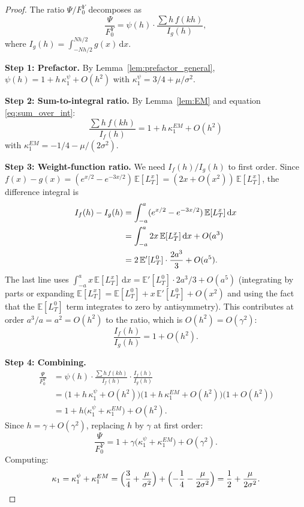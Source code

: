 \documentclass[11pt]{article}
\theoremstyle{definition}
\theoremstyle{remark}
\newcommand{\E}{\mathbb{E}}
\newcommand{\dd}{\,\mathrm{d}}
\begin{document}
\begin{proof}
The ratio $\Psi/F_0^Y$ decomposes as
\begin{equation}\label{eq:decompose}
\frac{\Psi}{F_0^Y}
= \psi(h) \cdot \frac{\sum h\,f(kh)}{I_g(h)},
\end{equation}
where $I_g(h) = \int_{-Nh/2}^{Nh/2} g(x)\dd x$.

\textbf{Step 1: Prefactor.} By
Lemma~\ref{lem:prefactor_general},
$\psi(h) = 1 + h\,\kappa_1^{\psi} + O(h^2)$ with
$\kappa_1^{\psi} = 3/4 + \mu/\sigma^2$.

\textbf{Step 2: Sum-to-integral ratio.} By
Lemma~\ref{lem:EM} and equation \eqref{eq:sum_over_int}:
\[
\frac{\sum h\,f(kh)}{I_f(h)}
= 1 + h\,\kappa_1^{EM} + O(h^2)
\]
with $\kappa_1^{EM} = -1/4 - \mu/(2\sigma^2)$.

\textbf{Step 3: Weight-function ratio.}
We need $I_f(h)/I_g(h)$ to first order. Since $f(x) - g(x) =
(e^{x/2} - e^{-3x/2})\,\E[L^x_T] = (2x + O(x^2))\,\E[L^x_T]$,
the difference integral is
\begin{align}
I_f(h) - I_g(h) &= \int_{-a}^{a}
(e^{x/2} - e^{-3x/2})\,\E[L^x_T]\dd x \notag \\
&= \int_{-a}^a 2x\,\E[L^x_T]\dd x + O(a^3) \notag \\
&= 2\,\E'[L^0_T] \cdot \frac{2a^3}{3} + O(a^5).
\label{eq:If_minus_Ig}
\end{align}
The last line uses $\int_{-a}^a x\,\E[L^x_T]\dd x
= \E'[L^0_T]\cdot 2a^3/3 + O(a^5)$ (integrating by parts or
expanding $\E[L^x_T] = \E[L^0_T] + x\,\E'[L^0_T] + O(x^2)$ and
using the fact that the $\E[L^0_T]$ term integrates to zero by
antisymmetry). This contributes at order $a^3/a = a^2 = O(h^2)$ to
the ratio, which is $O(h^2) = O(\gamma^2)$:
\begin{equation}\label{eq:weight_ratio_first}
\frac{I_f(h)}{I_g(h)} = 1 + O(h^2).
\end{equation}

\textbf{Step 4: Combining.}
\begin{align*}
\frac{\Psi}{F_0^Y}
&= \psi(h) \cdot
\frac{\sum h\,f(kh)}{I_f(h)} \cdot \frac{I_f(h)}{I_g(h)} \\
&= \bigl(1 + h\,\kappa_1^{\psi} + O(h^2)\bigr)
\bigl(1 + h\,\kappa_1^{EM} + O(h^2)\bigr)
\bigl(1 + O(h^2)\bigr) \\
&= 1 + h\bigl(\kappa_1^{\psi} + \kappa_1^{EM}\bigr) + O(h^2).
\end{align*}
Since $h = \gamma + O(\gamma^2)$, replacing $h$ by $\gamma$ at
first order:
\[
\frac{\Psi}{F_0^Y}
= 1 + \gamma\bigl(\kappa_1^{\psi} + \kappa_1^{EM}\bigr) + O(\gamma^2).
\]
Computing:
\[
\kappa_1 = \kappa_1^{\psi} + \kappa_1^{EM}
= \Bigl(\frac{3}{4} + \frac{\mu}{\sigma^2}\Bigr)
+ \Bigl(-\frac{1}{4} - \frac{\mu}{2\sigma^2}\Bigr)
= \frac{1}{2} + \frac{\mu}{2\sigma^2}.
\qedhere
\]
\end{proof}
\end{document}
